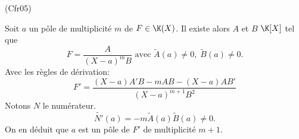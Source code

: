 \begin{tiny}(Cfr05)\end{tiny} Soit $a$ un pôle de multiplicité $m$ de $F\in \K(X)$. Il existe alors $A$ et $B$ $\K[X]$ tel que 
\[
  F = \frac{A}{(X-a)^m B} \text{ avec }
  \widetilde{A}(a) \neq 0, \; \widetilde{B}(a) \neq 0.
\]
Avec les règles de dérivation:
\[
  F' = \frac{(X-a)A'B -m AB -(X-a)AB'}{(X-a)^{m+1}B^2}
\]
Notons $N$ le numérateur.
\[
  \widetilde{N'}(a) = -m \widetilde{A}(a) \widetilde{B}(a) \neq 0.
\]
On en déduit que $a$ est un pôle de $F'$ de multiplicité $m+1$.
